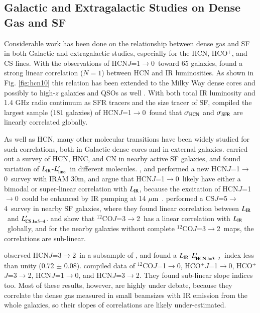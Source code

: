 \documentclass[legal,11pt]{article}
\def\,{\thinspace}
\def\mum{$\mu$m}
\def\Lcsff  {$L'_{\rm CS\, J=5-4}$}
\def\Lline  {$L'_{\rm line}$}
\def\LIR     {$L_{\rm IR}$}
\def\LHCNtt  {$L'_{\rm HCN\, J=3-2}$}
\def\COtt    {CO$J=3-2$}
\def\HCOP       {HCO$^{+}$}
\def\HCNoz      {HCN\,$J$=1$\rightarrow$0}
\def\HCOPoz      {HCO$^+$\,$J$=1$\rightarrow$0}
\def\HCOPtt      {HCO$^+$\,$J$=3$\rightarrow$2}
\def\HCNtt        {HCN\,$J$=3$\rightarrow$2}
\def\CSff          {CS\,$J$=5$\rightarrow$4}
\def\COoz      {$^{12}$CO$J$=1$\rightarrow$0}
\def\COtt      {$^{12}$CO$J$=3$\rightarrow$2}
\begin{document}
\subsection{Galactic and Extragalactic Studies on Dense Gas and SF}

Considerable work has been done on the relationship between dense gas and SF in
both Galactic and extragalactic studies, especially for the HCN, \HCOP, and CS
lines. With the observations of \HCNoz\ toward 65 galaxies, \citet{gs04a,gs04b}
found a strong linear correlation ($N=1$) between HCN and IR luminosities. As
shown in Fig. \ref{fig:hcn10} this relation has been extended to the Milky Way
dense cores  \citep{weg05} and possibly to high-$z$ galaxies and QSOs as well
\citep{Gao2007}. With both total IR luminosity and 1.4 GHz radio continuum as
SFR tracers and the size tracer of SF, \cite{lgg2015} compiled the largest
sample (181 galaxies) of \HCNoz\ found that $\sigma_{\rm HCN}$ and $\sigma_{\rm
SFR}$ are linearly correlated globally.   

As well as HCN, many other molecular transitions have been widely studied for
such correlations, both in Galactic dense cores and in external galaxies.
\cite{Baan08} carried out a survey of HCN, HNC, and CN in nearby active SF
galaxies, and found variation of \LIR-\Lline\ in different molecules.
\citet{gc08}, and \citet{gb12} performed a new \HCNoz\ survey with IRAM 30m,
and argue that \HCNoz\ likely have either a bimodal or super-linear correlation
with \LIR, because the excitation of \HCNoz\ could be enhanced by IR pumping at
14 \mum\ \citep{Weiss2007,sae10}.  \cite{Wang2011} performed a \CSff\ survey in
nearby SF galaxies, where they found linear correlation between \LIR\ and
\Lcsff. \citet{msh10} and \citet{Wilson2012} show that \COtt\ has a linear
correlation with \LIR\ globally, and for the nearby galaxies without complete
\COtt\ maps, the correlations are sub-linear. 

\cite{bns08} observed \HCNtt\ in a subsample of \citet{gs04a}, and found a
\LIR-\LHCNtt\ index less than unity (0.72 $\pm$ 0.08). \cite{jnm09} compiled
data of \COoz, \HCOPoz, \HCOPtt, \HCNoz, and \HCNtt. They found sub-linear
slope indices too. Most of these results, however, are highly under debate,
because they correlate the dense gas measured in small beamsizes with IR
emission from the whole galaxies, so their slopes of correlations are likely
under-estimated.
\end{document}
